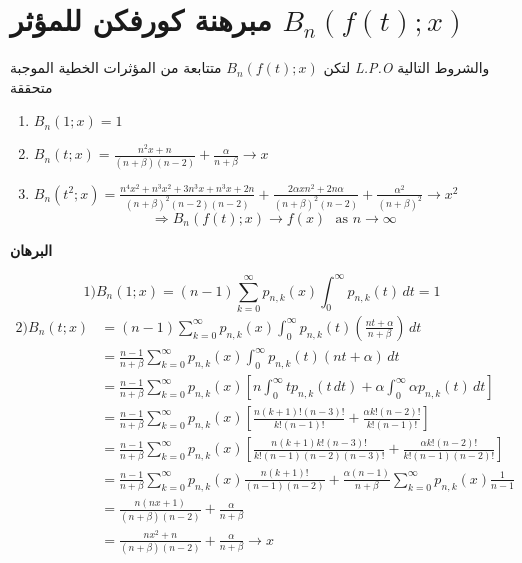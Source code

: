\newpage
\section{مبرهنة كورفكن للمؤثر $B_n(f(t); x)$}
لتكن $B_n(f(t);x)$ متتابعة من المؤثرات الخطية الموجبة \textit{L.P.O} والشروط التالية متحققة 
\begin{english}
	\begin{enumerate}[label=\arabic*)]
		\item $B_n(1; x) =1$
		\item $B_n(t; x) = \frac{n^2x + n}{(n+ \beta)(n-2)} + \frac{\alpha}{n + \beta} \to x$
		\item $B_n(t^2; x) = \frac{n^4x^2 + n^3x^2 + 3n^3x + n^3 x + 2n}{(n+\beta)^2 (n-2)(n-2)} + \frac{2\alpha x n^2 + 2n \alpha}{(n+\beta)^2 (n-2)} + \frac{\alpha^2 }{(n+\beta)^2} \to x^2$
		\[
		\Rightarrow B_n(f(t); x) \to f(x)\,\, \text{ as $n \to \infty$}
		\]
	\end{enumerate}
\end{english}
\noindent
\textbf{{البرهان}}	

\noindent
\[
1) B_n(1; x) = (n-1) \sum_{k=0}^{\infty} p_{n, k}(x) \int_{0}^{\infty} p_{n, k}(t) \, dt = 1
\]
\begin{align*}
	2) B_n(t; x) &= (n-1) \sum_{k=0}^{\infty} p_{n, k}(x) \int_{0}^{\infty} p_{n, k}(t) \left(\frac{nt+\alpha}{n + \beta}\right)\, dt \\
	&= \frac{n-1}{n+\beta} \sum_{k=0}^{\infty} p_{n, k}(x) \int_{0}^{\infty} p_{n, k}(t) (nt + \alpha) \, dt\\
	&= \frac{n-1}{n+\beta} \sum_{k=0}^{\infty} p_{n, k}(x) \left[n\int_{0}^{\infty} t p_{n, k}(t\, dt) + \alpha \int_{0}^{\infty} \alpha p_{n,k}(t)\, dt\right]\\
	&= \frac{n-1}{n+\beta} \sum_{k=0}^{\infty} p_{n, k}(x) \left[\textstyle
	\frac{n(k+1)! (n-3)!}{k!(n-1)!} + \frac{\alpha k!(n-2)!}{k!(n-1)!}
	\right]\\
	&= \frac{n-1}{n+\beta} \sum_{k=0}^{\infty} p_{n, k}(x) \left[\textstyle
	\frac{n(k+1)k!(n-3)!}{k!(n-1)(n-2)(n-3)!} + \frac{\alpha k! (n-2)!}{k! (n-1)(n-2)!}
	\right]\\
	&= \frac{n-1}{n+\beta} \sum_{k=0}^{\infty} p_{n, k}(x) \frac{n(k+1)!}{(n-1)(n-2)} + \frac{\alpha(n-1)}{n+\beta} \sum_{k=0}^{\infty} p_{n, k}(x) \frac{1}{n-1}\\
	&= \frac{n(nx + 1)}{(n+\beta)(n-2)} + \frac{\alpha}{n + \beta}\\
	&= \frac{nx^2 + n}{(n+\beta)(n-2)} + \frac{\alpha}{n + \beta} \to x
\end{align*}


